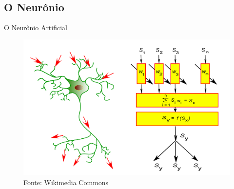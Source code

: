 \documentclass{beamer}
\begin{document}
    \subsection{O Neurônio}  
      \begin{frame}{O Neurônio Artificial}
	\begin{figure}[htpb]
	  \includegraphics[scale=0.2]{neuronio.png}
	  \caption{Fonte: Wikimedia Commons }
	\end{figure}
      \end{frame}
      
\end{document}
